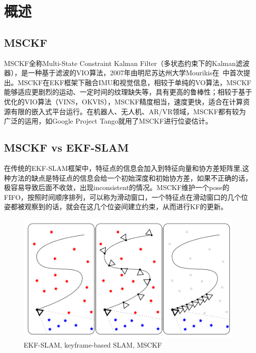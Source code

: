 \documentclass[12pt,a4paper]{article}
\begin{document}
\maketitle
\tableofcontents

\noindent
\setlength{\parindent}{2em}
\setlength{\parskip}{0.3em}
\linespread{1}

\newpage
\section{概述}

\subsection{MSCKF}

MSCKF全称Multi-State Constraint Kalman Filter（多状态约束下的Kalman滤波器），是一种基于滤波的VIO算法，2007年由明尼苏达州大学Mourikis在~\cite{mourikis2007multi}中首次提出。MSCKF在EKF框架下融合IMU和视觉信息，相较于单纯的VO算法，MSCKF能够适应更剧烈的运动、一定时间的纹理缺失等，具有更高的鲁棒性；相较于基于优化的VIO算法（VINS，OKVIS），MSCKF精度相当，速度更快，适合在计算资源有限的嵌入式平台运行。在机器人、无人机、AR/VR领域，MSCKF都有较为广泛的运用，如Google Project Tango就用了MSCKF进行位姿估计。

\subsection{MSCKF vs EKF-SLAM}

在传统的EKF-SLAM框架中，特征点的信息会加入到特征向量和协方差矩阵里,这种方法的缺点是特征点的信息会给一个初始深度和初始协方差，如果不正确的话，极容易导致后面不收敛，出现inconsistent的情况。MSCKF维护一个pose的FIFO，按照时间顺序排列，可以称为滑动窗口，一个特征点在滑动窗口的几个位姿都被观察到的话，就会在这几个位姿间建立约束，从而进行KF的更新。~\cite{shelley2014monocular}

\begin{figure}[H]
\centering
\includegraphics[scale=0.25]{images/ekf-slam-vs-msckf.png}
\caption{EKF-SLAM, keyframe-based SLAM, MSCKF}
\end{figure}
\end{document}
